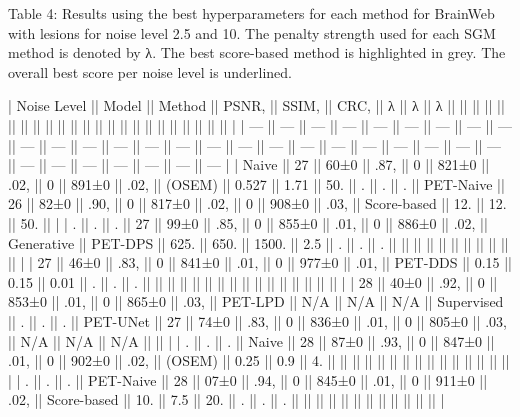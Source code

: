 \documentclass{article}
\begin{document}
Table 4: Results using the best hyperparameters for each method for BrainWeb with lesions for noise level 2.5 and 10. The penalty strength used for each SGM method is denoted by λ. The best score-based method is highlighted in grey. The overall best score per noise level is underlined.

| Noise Level || Model || Method || PSNR,     || SSIM,    || CRC,  || λ    || λ     || λ     ||            ||         ||       ||            ||             ||      ||      ||       ||           ||     ||      ||      ||      ||       ||       ||      ||       ||      ||             ||         ||       ||       ||     |
| ---         || ---   || ---    || ---       || ---      || ---   || ---  || ---   || ---   || ---        || ---     || ---   || ---        || ---         || ---  || ---  || ---   || ---       || --- || ---  || ---  || ---  || ---   || ---   || ---  || ---   || ---  || ---         || ---     || ---   || ---   || --- |
| Naive       || 27    || 60±0   || .87,      || 0        || 821±0 || .02, || 0     || 891±0 || .02,       || (OSEM)  || 0.527 || 1.71       || 50.         || .    || .    || .     || PET-Naive || 26  || 82±0 || .90, || 0    || 817±0 || .02,  || 0    || 908±0 || .03, || Score-based || 12.     || 12.   || 50.   ||     |
| .           || .     || .      || 27        || 99±0     || .85,  || 0    || 855±0 || .01,  || 0          || 886±0   || .02,  || Generative || PET-DPS     || 625. || 650. || 1500. || 2.5       || .   || .    || .    ||      ||       ||       ||      ||       ||      ||             ||         ||       ||       ||     |
| 27          || 46±0  || .83,   || 0         || 841±0    || .01,  || 0    || 977±0 || .01,  || PET-DDS    || 0.15    || 0.15  || 0.01       || .           || .    || .    ||       ||           ||     ||      ||      ||      ||       ||       ||      ||       ||      ||             ||         ||       ||       ||     |
| 28          || 40±0  || .92,   || 0         || 853±0    || .01,  || 0    || 865±0 || .03,  || PET-LPD    || N/A     || N/A   || N/A        || Supervised  || .    || .    || .     || PET-UNet  || 27  || 74±0 || .83, || 0    || 836±0 || .01,  || 0    || 805±0 || .03, || N/A         || N/A     || N/A   ||       ||     |
| .           || .     || .      || Naive     || 28       || 87±0  || .93, || 0     || 847±0 || .01,       || 0       || 902±0 || .02,       || (OSEM)      || 0.25 || 0.9  || 4.    ||           ||     ||      ||      ||      ||       ||       ||      ||       ||      ||             ||         ||       ||       ||     |
| .           || .     || .      || PET-Naive || 28       || 07±0  || .94, || 0     || 845±0 || .01,       || 0       || 911±0 || .02,       || Score-based || 10.  || 7.5  || 20.   || .         || .   || .    ||      ||      ||       ||       ||      ||       ||      ||             ||         ||       ||       ||     |
\end{document}
